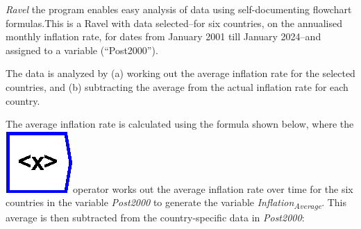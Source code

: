\emph{Ravel} the program enables easy analysis of data using self-documenting
flowchart formulas.This is a Ravel with data selected--for six countries,
on the annualised monthly inflation rate, for dates from January 2001
till January 2024--and assigned to a variable (``Post2000'').
\noindent \begin{flushleft}
\par\end{flushleft}

The data is analyzed by (a) working out the average inflation rate
for the selected countries, and (b) subtracting the average from the
actual inflation rate for each country.

The average inflation rate is calculated using the formula shown below,
where the \includegraphics{images/mean}operator works out the average
inflation rate over time for the six countries in the variable \emph{Post2000}
to generate the variable \emph{Inflation}\textsubscript{\emph{Average}}.
This average is then subtracted from the country-specific data in
\emph{Post2000}:

